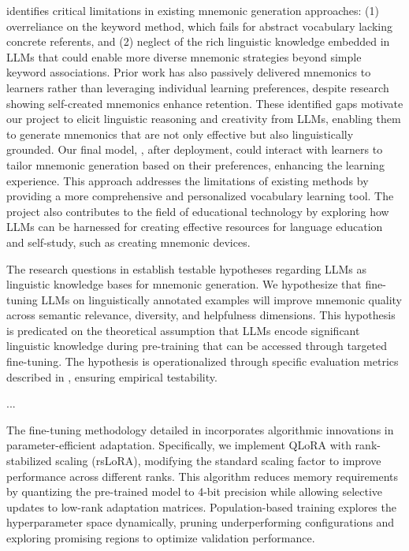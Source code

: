   identifies critical limitations in existing mnemonic generation approaches: (1) overreliance on the keyword method, which fails for abstract vocabulary lacking concrete referents, and (2) neglect of the rich linguistic knowledge embedded in LLMs that could enable more diverse mnemonic strategies beyond simple keyword associations. Prior work has also passively delivered mnemonics to learners rather than leveraging individual learning preferences, despite research showing self-created mnemonics enhance retention. These identified gaps motivate our project to elicit linguistic reasoning and creativity from LLMs, enabling them to generate mnemonics that are not only effective but also linguistically grounded. Our final model, \linksys, after deployment, could interact with learners to tailor mnemonic generation based on their preferences, enhancing the learning experience. This approach addresses the limitations of existing methods by providing a more comprehensive and personalized vocabulary learning tool. The project also contributes to the field of educational technology by exploring how LLMs can be harnessed for creating effective resources for language education and self-study, such as creating mnemonic devices.

 The research questions in  establish testable hypotheses regarding LLMs as linguistic knowledge bases for mnemonic generation. We hypothesize that fine-tuning LLMs on linguistically annotated examples will improve mnemonic quality across semantic relevance, diversity, and helpfulness dimensions. This hypothesis is predicated on the theoretical assumption that LLMs encode significant linguistic knowledge during pre-training that can be accessed through targeted fine-tuning. The hypothesis is operationalized through specific evaluation metrics described in , ensuring empirical testability.


 ...

 The fine-tuning methodology detailed in  incorporates algorithmic innovations in parameter-efficient adaptation. Specifically, we implement QLoRA with rank-stabilized scaling (rsLoRA), modifying the standard scaling factor to improve performance across different ranks. This algorithm reduces memory requirements by quantizing the pre-trained model to 4-bit precision while allowing selective updates to low-rank adaptation matrices. Population-based training explores the hyperparameter space dynamically, pruning underperforming configurations and exploring promising regions to optimize validation performance.

